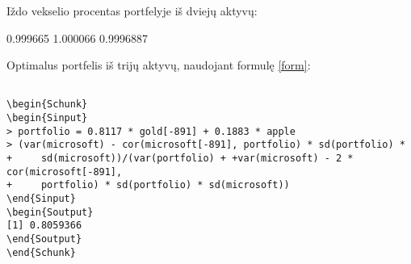 \documentclass[12pt, a14paper, lithuanian]{article}
\begin{document}
 Iždo vekselio procentas portfelyje iš dviejų aktyvų:


\begin{Schunk}
\begin{Soutput}
         [,1]     [,2]      [,3]
[1,] 0.999665 1.000066 0.9996887
\end{Soutput}
\end{Schunk}



\begin{comment}

 Apytikslės koeficientų reikšmės portfelyje iš dviejų įmonių:



\begin{figure}[H]
  \centering
  \begin{verbatim}
\texttt{[image: kursinis-029]}
\end{verbatim}
  \caption{...}
  
\end{figure}

(gal nereikia)
Iliustracija: pagal grafikus rinktis ta skaiciu, ties kuriuo standartinis nuokrypis maziausias, ji istatyti vietoje i.

\textit{optimaliausias portfelis} = $imone1 \times i \times 0.1 + imone2 \times (1 - i\times 0.1)$ \\


$0.1 \times (i-1) \times Auksas + (1-0.1 \times (i-1)) \times Microsoft$

$0.1 \times (i-1) \times Apple + (1-0.1 \times (i-1)) \times Microsoft$

$0.1 \times (i-1) \times Apple + (1-0.1\times (i-1)) \times Auksas$

\end{comment}

Optimalus portfelis iš trijų aktyvų, naudojant formulę \eqref{form}:

\begin{verbatim}

\begin{Schunk}
\begin{Sinput}
> portfolio = 0.8117 * gold[-891] + 0.1883 * apple
> (var(microsoft) - cor(microsoft[-891], portfolio) * sd(portfolio) * 
+     sd(microsoft))/(var(portfolio) + +var(microsoft) - 2 * cor(microsoft[-891], 
+     portfolio) * sd(portfolio) * sd(microsoft))
\end{Sinput}
\begin{Soutput}
[1] 0.8059366
\end{Soutput}
\end{Schunk}

\end{verbatim}
\end{document}
